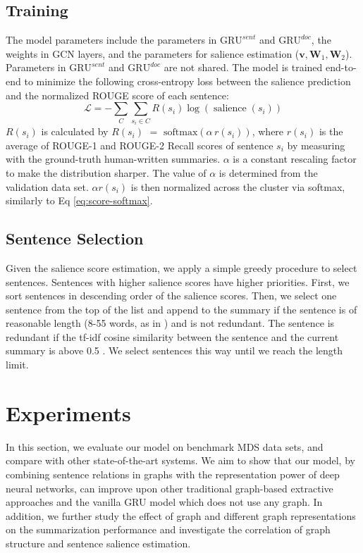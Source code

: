 \documentclass[11pt,a4paper]{article}
\renewcommand{\vec}[1]{\mathbf{#1}}
\DeclareMathOperator{\sal}{salience}
\begin{document}
\subsection{Training}
The model parameters include the parameters in $\mathrm{GRU}^{sent}$ and $\mathrm{GRU}^{doc}$, the weights in GCN layers, and the parameters for salience estimation ($\vec{v},\vec{W}_1,\vec{W}_2$).
Parameters in $\mathrm{GRU}^{sent}$ and $\mathrm{GRU}^{doc}$ are not shared.
The model is trained end-to-end to minimize the following cross-entropy loss between the salience prediction and the normalized ROUGE score of each sentence:
\begin{equation}
\label{eq:loss}
\mathcal{L} = -\sum_{C}\sum_{s_i \in C} R(s_i)\log(\sal(s_i))
\end{equation}
$R(s_i)$ is calculated by $R(s_i)$ $=$ $\mathrm{softmax}(\alpha\, r(s_i))$, where $r(s_i)$ is
the average of ROUGE-1 and ROUGE-2 Recall scores of sentence $s_i$ by measuring with the ground-truth human-written summaries. 
$\alpha$ is a constant rescaling factor to make the distribution sharper. 
The value of $\alpha$ is determined from the validation data set.
$\alpha r(s_i)$ is then normalized across the cluster via softmax, similarly to Eq \ref{eq:score-softmax}.

\subsection{Sentence Selection}
Given the salience score estimation, we apply a simple greedy procedure to select sentences.
Sentences with higher salience scores have higher priorities.
First, we sort sentences in descending order of the salience scores.
Then, we select one sentence from the top of the list and append to the summary if the sentence is of reasonable length (8-55 words, as in \cite{erkan2004lexrank}) and is not redundant.
The sentence is redundant if the tf-idf cosine similarity between the sentence and the current summary is above 0.5 \cite{hong2014improving}.
We select sentences this way until we reach the length limit.

\section{Experiments}
In this section, we evaluate our model on benchmark MDS data sets, and compare with other state-of-the-art systems.
We aim to show that our model, by combining sentence relations in graphs with the representation power of deep neural networks, can improve upon other traditional graph-based extractive approaches and the vanilla GRU model which does not use any graph.
In addition, we further study the effect of graph and different graph representations on the summarization performance and investigate the correlation of graph structure and sentence salience estimation.
\end{document}
